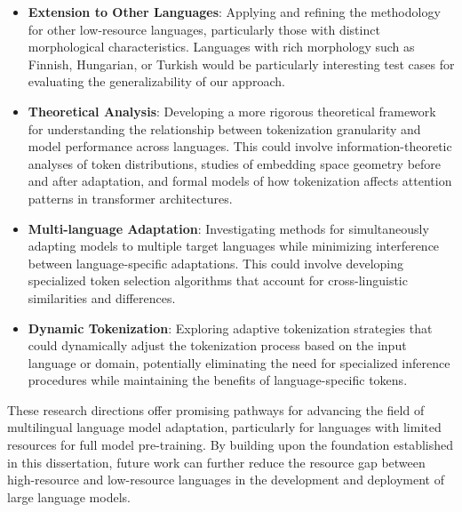 \begin{itemize}
    \item \textbf{Extension to Other Languages}: Applying and refining the methodology for other low-resource languages, particularly those with distinct morphological characteristics. Languages with rich morphology such as Finnish, Hungarian, or Turkish would be particularly interesting test cases for evaluating the generalizability of our approach.
    
    \item \textbf{Theoretical Analysis}: Developing a more rigorous theoretical framework for understanding the relationship between tokenization granularity and model performance across languages. This could involve information-theoretic analyses of token distributions, studies of embedding space geometry before and after adaptation, and formal models of how tokenization affects attention patterns in transformer architectures.
    
    \item \textbf{Multi-language Adaptation}: Investigating methods for simultaneously adapting models to multiple target languages while minimizing interference between language-specific adaptations. This could involve developing specialized token selection algorithms that account for cross-linguistic similarities and differences.
    
    \item \textbf{Dynamic Tokenization}: Exploring adaptive tokenization strategies that could dynamically adjust the tokenization process based on the input language or domain, potentially eliminating the need for specialized inference procedures while maintaining the benefits of language-specific tokens.
\end{itemize}

These research directions offer promising pathways for advancing the field of multilingual language model adaptation, particularly for languages with limited resources for full model pre-training. By building upon the foundation established in this dissertation, future work can further reduce the resource gap between high-resource and low-resource languages in the development and deployment of large language models.
